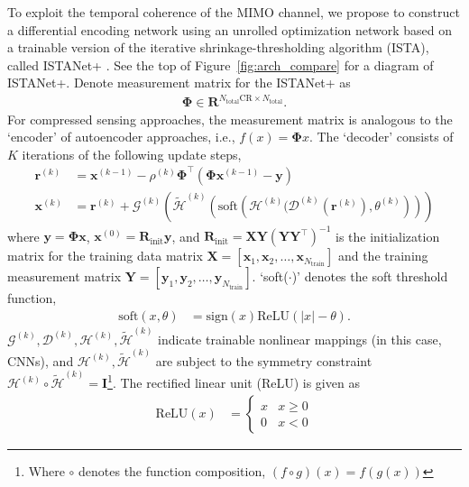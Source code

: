 To exploit the temporal coherence of the MIMO channel, we propose to construct a differential encoding network using an unrolled optimization network based on a trainable version of the iterative shrinkage-thresholding algorithm (ISTA), called ISTANet+ \cite{ref:zhang2018ista}. See the top of Figure~\ref{fig:arch_compare} for a diagram of ISTANet+. Denote measurement matrix for the ISTANet+ as 
\begin{align}
    \mathbf \Phi \in \mathbf{R}^{N_{\text{total}}\text{CR} \times N_{\text{total}}}.
\end{align}
For compressed sensing approaches, the measurement matrix is analogous to the `encoder' of autoencoder approaches, i.e., $f(x)=\mathbf\Phi x$. The `decoder' consists of $K$ iterations of the following update steps,
\begin{align}
    \mathbf{r}^{(k)} &= \mathbf{x}^{(k-1)}-\rho^{(k)}\mathbf{\Phi}^\top(\mathbf{\Phi}\mathbf x^{(k-1)}-\mathbf y) \label{eq:istanet-grad} \\
    \mathbf x^{(k)} &= \mathbf{r}^{(k)} + \mathcal{G}^{(k)}\left(\tilde{\mathcal{H}}^{(k)}\left(\text{soft}\left(\mathcal{H}^{(k)}(\mathcal{D}^{(k)}(\mathbf{r}^{(k)}), \theta^{(k)}\right)\right)\right) \label{eq:istanet-prox}
\end{align}
where $\mathbf y=\mathbf{\Phi} \mathbf x$, $\mathbf x^{(0)}=\mathbf{R}_{\text{init}}\mathbf{y}$, and $\mathbf R_{\text{init}}=\mathbf {XY}(\mathbf{YY}^\top)^{-1}$ is the initialization matrix for the training data matrix $\mathbf X = \left[\mathbf{x}_1, \mathbf{x}_2,\dots, \mathbf{x}_{N_{\text{train}}}\right]$ and the training measurement matrix $\mathbf Y = \left[\mathbf{y}_1, \mathbf{y}_2,\dots, \mathbf{y}_{N_{\text{train}}}\right]$. `soft($\cdot$)' denotes the soft threshold function,
\begin{align}
    \text{soft}(x, \theta) &= \text{sign}(x)\text{ReLU}(|x|-\theta). \label{eq:soft}
\end{align}
$\mathcal G^{(k)}, \mathcal D^{(k)},  \mathcal H^{(k)}, \tilde{\mathcal H}^{(k)}$ indicate trainable nonlinear mappings (in this case, CNNs), and $\mathcal H^{(k)}, \tilde{\mathcal H}^{(k)}$ are subject to the symmetry constraint $\mathcal H^{(k)}\circ \tilde{\mathcal H}^{(k)}=\mathbf I$\footnote{Where $\circ$ denotes the function composition, $(f \circ g)(x) = f(g(x))$}. The rectified linear unit (ReLU) is given as
\begin{align*}
    \text{ReLU}(x) &= 
        \begin{cases}
            x & x \geq 0 \\
            0 & x < 0
        \end{cases}
\end{align*}
